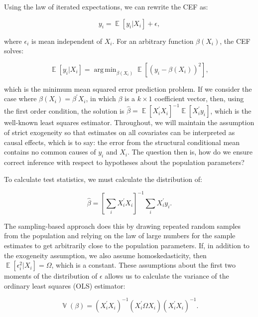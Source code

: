 \documentclass[11pt]{article}
\DeclareMathOperator{\E}{\mathbb{E}}
\DeclareMathOperator{\V}{\mathbb{V}}
\DeclareMathOperator*{\argmin}{arg\,min}
\begin{document}
Using the law of iterated expectations, we can rewrite the CEF as:

\begin{equation}
    y_i = \E \left[ y_i | X_i \right] + \epsilon,
\end{equation}

\noindent where $\epsilon_i$ is mean independent of $X_i$. For an arbitrary function $\beta(X_i)$, the CEF solves:

\begin{equation}
    \E \left[ y_i | X_i \right] = \argmin_{\beta(X_i)} \E \left[ \left( y_i - \beta (X_i ) \right)^2 \right],
\end{equation}

\noindent which is the minimum mean squared error prediction problem. If we consider the case where $\beta (X_i ) = \beta^{'} X_i$, in which $\beta$ is a $k \times 1$ coefficient vector, then, using the first order condition, the solution is $\hat{\beta} = \E [X_{i}^{'} X_{i}]^{-1} \E [X_{i}^{'} y_{i}]$, which is the well-known least squares estimator. Throughout, we will maintain the assumption of strict exogeneity so that estimates on all covariates can be interpreted as causal effects, which is to say: the error from the structural conditional mean contains no common causes of $y_i$ and $X_i$. The question then is, how do we ensure correct inference with respect to hypotheses about the population parameters?

To calculate test statistics, we must calculate the distribution of:

\begin{equation}
    \hat{\beta} = \left[ \sum_{i} X_{i}^{'} X_{i} \right]^{-1} \sum_{i} X_{i}^{'} y_{i}.
\end{equation}

\noindent The sampling-based approach does this by drawing repeated random samples from the population and relying on the law of large numbers for the sample estimates to get arbitrarily close to the population parameters. If, in addition to the exogeneity assumption, we also assume homoskedasticity, then $\E [ \epsilon_{i}^{2} | X_i ] = \Omega$, which is a constant. These assumptions about the first two moments of the distribution of $\epsilon$ allows us to calculate the variance of the ordinary least squares (OLS) estimator:

\begin{equation}
    \V (\beta) = \left( X_{i}^{'} X_{i} \right)^{-1} \left( X_{i}^{'} \Omega X_{i} \right) \left( X_{i}^{'} X_{i} \right)^{-1}.
\end{equation}
\end{document}
